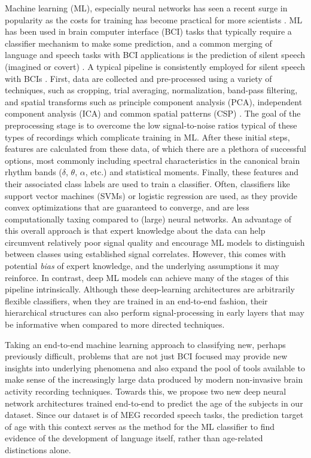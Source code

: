 \documentclass[utf8]{frontiersSCNS} %
\begin{document}
Machine learning (ML), especially neural networks has seen a recent surge in popularity as the costs for training has become practical for more scientists \cite{LeCun2015}. ML has been used in brain computer interface (BCI) tasks that typically require a classifier mechanism to make some prediction, and a common merging of language and speech tasks with BCI applications is the prediction of silent speech (imagined or covert) \cite{Sereshkeh2017, Guimaraes2007, Zhao2015a}. A typical pipeline is consistently employed for silent speech with BCIs \cite{RezaeiTabar2016}. First, data are collected and pre-processed using a variety of techniques, such as cropping, trial averaging, normalization, band-pass filtering, and spatial transforms such as principle component analysis (PCA), independent component analysis (ICA) and common spatial patterns (CSP) \cite{Muller-Gerking1999}. The goal of the preprocessing stage is to overcome the low signal-to-noise ratios typical of these types of recordings which complicate training in ML. After these initial steps, features are calculated from these data, of which there are a plethora of successful options, most commonly including spectral characteristics in the canonical brain rhythm bands ($\delta$, $\theta$, $\alpha$, etc.) and statistical moments. Finally, these features and their associated class labels are used to train a classifier. Often, classifiers like support vector machines (SVMs) or logistic regression are used, as they provide convex optimizations that are guaranteed to converge, and are less computationally taxing compared to (large) neural networks. An advantage of this overall approach is that expert knowledge about the data can help circumvent relatively poor signal quality and encourage ML models to distinguish between classes using established signal correlates. However, this comes with potential \emph{bias} of expert knowledge, and the underlying assumptions it may reinforce. In contrast, deep ML models can achieve many of the stages of this pipeline intrinsically. Although these deep-learning architectures are arbitrarily flexible classifiers, when they are trained in an end-to-end fashion, their hierarchical structures can also perform signal-processing in early layers that may be informative when compared to more directed techniques.

Taking an end-to-end machine learning approach to classifying new, perhaps previously difficult, problems that are not just BCI focused may provide new insights into underlying phenomena and also expand the pool of tools available to make sense of the increasingly large data produced by modern non-invasive brain activity recording techniques. Towards this, we propose two new deep neural network architectures trained end-to-end to predict the age of the subjects in our dataset. Since our dataset is of MEG recorded speech tasks, the prediction target of age with this context serves as the method for the ML classifier to find evidence of the development of language itself, rather than age-related distinctions alone.
\end{document}
